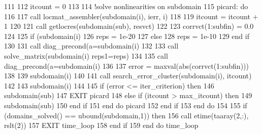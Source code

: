 \begin{DoxyCode}
111               
112               itcount = 0
113               
114               \textcolor{comment}{!solve nonlinearities on subdomain}
115               picard: \textcolor{keywordflow}{do}
116               
117                 \textcolor{keyword}{call }locmat_assembler(subdomain(i), ierr, i)
118               
119                 itcount = itcount + 1
120                 
121                 \textcolor{keyword}{call }getlocres(subdomain(sub), resvct)
122                 
123                 corrvct(1:subfin) = 0.0
124 
125                 \textcolor{keywordflow}{if} (subdomain(i)%
126                   reps = 1e-20
127                 \textcolor{keywordflow}{else}
128                   reps = 1e-10
129 \textcolor{keywordflow}{                end if}
130                 
131                 \textcolor{keyword}{call }diag_precond(a=subdomain(i)%
132                 
133                 \textcolor{keyword}{call }solve_matrix(subdomain(i)%
      reps1=reps)
134 
135                 \textcolor{keyword}{call }diag_precond(a=subdomain(i)%
136                 
137                 error = maxval(abs(corrvct(1:subfin)))
138                 
139                 subdomain(i)%
140                 
141                 \textcolor{keyword}{call }search_error_cluster(subdomain(i), itcount) 
142                 
143                 subdomain(i)%
144                 
145                 \textcolor{keywordflow}{if} (error <= iter_criterion) \textcolor{keywordflow}{then}
146                   subdomain(sub)%
147                   \textcolor{keywordflow}{EXIT} picard
148                 \textcolor{keywordflow}{else} \textcolor{keywordflow}{if} (itcount > max_itcount) \textcolor{keywordflow}{then}
149                   subdomain(sub)%
150 \textcolor{keywordflow}{                end if}
151 \textcolor{keywordflow}{              end do} picard
152 \textcolor{keywordflow}{            end if}
153 \textcolor{keywordflow}{          end do}
154               
155           \textcolor{keywordflow}{if} (domains_solved() == ubound(subdomain,1)) \textcolor{keywordflow}{then}
156             \textcolor{keyword}{call }etime(taaray(2,:), rslt(2))
157             \textcolor{keywordflow}{EXIT} time\_loop
158 \textcolor{keywordflow}{         end if}
159 \textcolor{keywordflow}{        end do} time\_loop

\end{DoxyCode}
